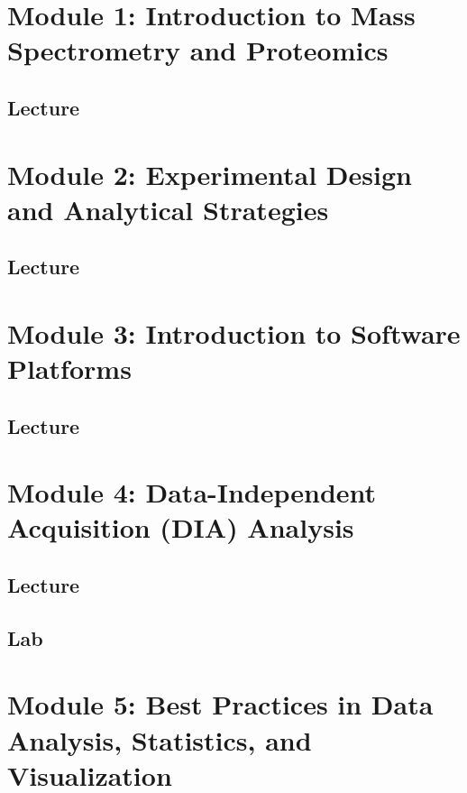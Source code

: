 \documentclass[
]{book}
\begin{document}
\chapter{Module 1: Introduction to Mass Spectrometry and Proteomics}\label{module-1-introduction-to-mass-spectrometry-and-proteomics}

\section{Lecture}\label{lecture}

\chapter{Module 2: Experimental Design and Analytical Strategies}\label{module-2-experimental-design-and-analytical-strategies}

\section{Lecture}\label{lecture-1}

\chapter{Module 3: Introduction to Software Platforms}\label{module-3-introduction-to-software-platforms}

\section{Lecture}\label{lecture-2}

\chapter{Module 4: Data-Independent Acquisition (DIA) Analysis}\label{module-4-data-independent-acquisition-dia-analysis}

\section{Lecture}\label{lecture-3}

\section{Lab}\label{lab}

\chapter{Module 5: Best Practices in Data Analysis, Statistics, and Visualization}\label{module-5-best-practices-in-data-analysis-statistics-and-visualization}
\end{document}
